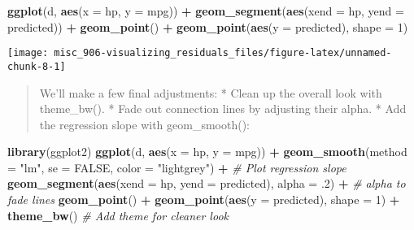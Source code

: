 \documentclass[]{book}
\newenvironment{Shaded}{\begin{snugshade}}{\end{snugshade}}
\newcommand{\CommentTok}[1]{\textcolor[rgb]{0.56,0.35,0.01}{\textit{#1}}}
\newcommand{\DataTypeTok}[1]{\textcolor[rgb]{0.13,0.29,0.53}{#1}}
\newcommand{\DecValTok}[1]{\textcolor[rgb]{0.00,0.00,0.81}{#1}}
\newcommand{\FloatTok}[1]{\textcolor[rgb]{0.00,0.00,0.81}{#1}}
\newcommand{\KeywordTok}[1]{\textcolor[rgb]{0.13,0.29,0.53}{\textbf{#1}}}
\newcommand{\NormalTok}[1]{#1}
\newcommand{\OperatorTok}[1]{\textcolor[rgb]{0.81,0.36,0.00}{\textbf{#1}}}
\newcommand{\OtherTok}[1]{\textcolor[rgb]{0.56,0.35,0.01}{#1}}
\newcommand{\StringTok}[1]{\textcolor[rgb]{0.31,0.60,0.02}{#1}}
\begin{document}
\begin{Shaded}
\begin{Highlighting}[]
\KeywordTok{ggplot}\NormalTok{(d, }\KeywordTok{aes}\NormalTok{(}\DataTypeTok{x =}\NormalTok{ hp, }\DataTypeTok{y =}\NormalTok{ mpg)) }\OperatorTok{+}
\StringTok{  }\KeywordTok{geom_segment}\NormalTok{(}\KeywordTok{aes}\NormalTok{(}\DataTypeTok{xend =}\NormalTok{ hp, }\DataTypeTok{yend =}\NormalTok{ predicted)) }\OperatorTok{+}
\StringTok{  }\KeywordTok{geom_point}\NormalTok{() }\OperatorTok{+}
\StringTok{  }\KeywordTok{geom_point}\NormalTok{(}\KeywordTok{aes}\NormalTok{(}\DataTypeTok{y =}\NormalTok{ predicted), }\DataTypeTok{shape =} \DecValTok{1}\NormalTok{)}
\end{Highlighting}
\end{Shaded}

\begin{center}\texttt{[image: misc\_906-visualizing\_residuals\_files/figure-latex/unnamed-chunk-8-1]} \end{center}

\begin{quote}
We'll make a few final adjustments:
* Clean up the overall look with theme\_bw().
* Fade out connection lines by adjusting their alpha.
* Add the regression slope with geom\_smooth():
\end{quote}

\begin{Shaded}
\begin{Highlighting}[]

\KeywordTok{library}\NormalTok{(ggplot2)}
\KeywordTok{ggplot}\NormalTok{(d, }\KeywordTok{aes}\NormalTok{(}\DataTypeTok{x =}\NormalTok{ hp, }\DataTypeTok{y =}\NormalTok{ mpg)) }\OperatorTok{+}
\StringTok{  }\KeywordTok{geom_smooth}\NormalTok{(}\DataTypeTok{method =} \StringTok{"lm"}\NormalTok{, }\DataTypeTok{se =} \OtherTok{FALSE}\NormalTok{, }\DataTypeTok{color =} \StringTok{"lightgrey"}\NormalTok{) }\OperatorTok{+}\StringTok{  }\CommentTok{# Plot regression slope}
\StringTok{  }\KeywordTok{geom_segment}\NormalTok{(}\KeywordTok{aes}\NormalTok{(}\DataTypeTok{xend =}\NormalTok{ hp, }\DataTypeTok{yend =}\NormalTok{ predicted), }\DataTypeTok{alpha =} \FloatTok{.2}\NormalTok{) }\OperatorTok{+}\StringTok{  }\CommentTok{# alpha to fade lines}
\StringTok{  }\KeywordTok{geom_point}\NormalTok{() }\OperatorTok{+}
\StringTok{  }\KeywordTok{geom_point}\NormalTok{(}\KeywordTok{aes}\NormalTok{(}\DataTypeTok{y =}\NormalTok{ predicted), }\DataTypeTok{shape =} \DecValTok{1}\NormalTok{) }\OperatorTok{+}
\StringTok{  }\KeywordTok{theme_bw}\NormalTok{()  }\CommentTok{# Add theme for cleaner look}
\end{Highlighting}
\end{Shaded}
\end{document}
